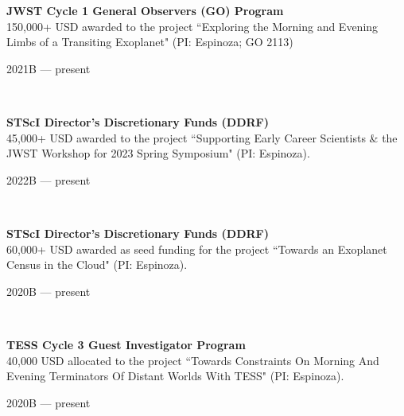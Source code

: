 \documentclass[12pt, a4paper]{article} %
\begin{document}
\begin{minipage}[t]{0.7\textwidth}
\begin{flushleft}%
  \setlength{\leftskip}{0.2cm}%
\textbf{JWST Cycle 1 General Observers (GO) Program}\\
150,000+ USD awarded to the project ``Exploring the Morning and Evening Limbs of a Transiting Exoplanet" (PI: Espinoza; GO 2113)
\end{flushleft}
\end{minipage}
\begin{minipage}[t]{0.3\textwidth}
\hfill 2021B --- present
\end{minipage}\\

\begin{minipage}[t]{0.7\textwidth}
\begin{flushleft}%
  \setlength{\leftskip}{0.2cm}%
\textbf{STScI Director's Discretionary Funds (DDRF)}\\
45,000+ USD awarded to the project ``Supporting Early Career Scientists \& the JWST Workshop for 2023 Spring Symposium" (PI: Espinoza).
\end{flushleft}
\end{minipage}
\begin{minipage}[t]{0.3\textwidth}
\hfill 2022B --- present
\end{minipage}\\

\begin{minipage}[t]{0.7\textwidth}
\begin{flushleft}%
  \setlength{\leftskip}{0.2cm}%
\textbf{STScI Director's Discretionary Funds (DDRF)}\\
60,000+ USD awarded as seed funding for the project ``Towards an Exoplanet Census in the Cloud" (PI: Espinoza).
\end{flushleft}
\end{minipage}
\begin{minipage}[t]{0.3\textwidth}
\hfill 2020B --- present
\end{minipage}\\

\begin{minipage}[t]{0.7\textwidth}
\begin{flushleft}%
  \setlength{\leftskip}{0.2cm}%
\textbf{TESS Cycle 3 Guest Investigator Program}\\
40,000 USD allocated to the project ``Towards Constraints On Morning And Evening Terminators Of Distant Worlds With TESS" (PI: Espinoza).
\end{flushleft}
\end{minipage}
\begin{minipage}[t]{0.3\textwidth}
\hfill 2020B --- present
\end{minipage}\\
\end{document}

